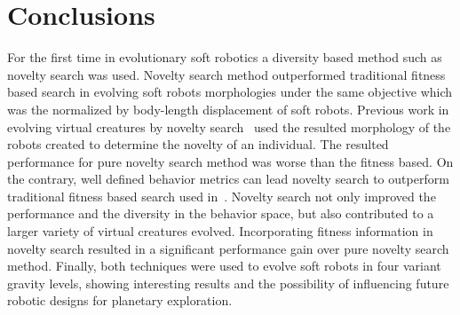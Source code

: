 \documentclass{sig-alternate}
\begin{document}
\section{Conclusions}
For the first time in evolutionary soft robotics a diversity based method such as novelty search was used. Novelty search method outperformed traditional fitness based search in evolving soft robots morphologies under the same objective which was the normalized by body-length displacement of soft robots. Previous work in evolving virtual creatures by novelty search~\cite{lehman2011evolving} used the resulted morphology of the robots created to determine the novelty of an individual. The resulted performance for pure novelty search method was worse than the fitness based. On the contrary, well defined behavior metrics can lead novelty search to outperform traditional fitness based search used in~\cite{cheney2013unshackling}. Novelty search not only improved the performance and the diversity in the behavior space, but also contributed to a larger variety of virtual creatures evolved. Incorporating fitness information in novelty search resulted in a significant performance gain over pure novelty search method. Finally, both techniques were used to evolve soft robots in four variant gravity levels, showing interesting results and the possibility of influencing future robotic designs for planetary exploration.




\begingroup
{}


\endgroup
\end{document}
